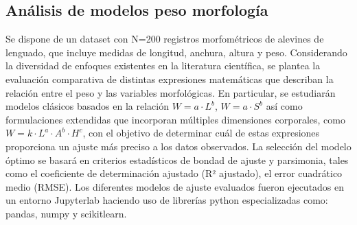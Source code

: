 \documentclass[a4paper,10pt,spanish]{jupyterBook}
\begin{document}
\subsection{Análisis de modelos peso \sphinxhyphen{} morfología}
\label{\detokenize{content/03/Coeficientes:analisis-de-modelos-peso-morfologia}}
\sphinxAtStartPar
Se dispone de un dataset  con N=200 registros morfométricos de alevines de lenguado, que incluye medidas de longitud, anchura, altura y peso. Considerando la diversidad de enfoques existentes en la literatura científica, se plantea la evaluación comparativa de distintas expresiones matemáticas que describan la relación entre el peso y las variables morfológicas. En particular, se estudiarán modelos clásicos basados en la relación \(W = a \cdot L^b\), \(W = a \cdot S^b\) así como formulaciones extendidas que incorporan múltiples dimensiones corporales, como \(W = k \cdot L^a \cdot A^b \cdot H^c\), con el objetivo de determinar cuál de estas expresiones proporciona un ajuste más preciso a los datos observados. La selección del modelo óptimo se basará en criterios estadísticos de bondad de ajuste y parsimonia, tales como el coeficiente de determinación ajustado (R² ajustado), el error cuadrático medio (RMSE).
Los diferentes modelos de ajuste evaluados fueron ejecutados en un entorno Jupyterlab haciendo uso de librerías python especializadas como: pandas, numpy y scikit\sphinxhyphen{}learn.
\end{document}
